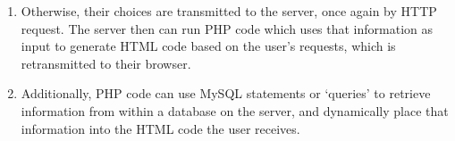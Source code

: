 \begin{enumerate}
			\item Otherwise, their choices are transmitted to the server, once again by HTTP request. The server then can run PHP code which uses that information as input to generate HTML code based on the user's requests, which is retransmitted to their browser.

			\item Additionally, PHP code can use MySQL statements or `queries' to retrieve information from within a database on the server, and dynamically place that information into the HTML code the user receives.	

		\end{enumerate}

